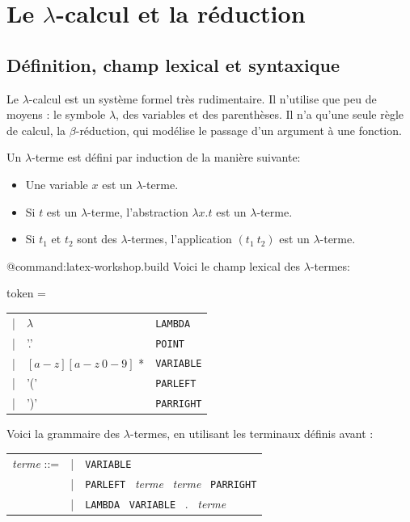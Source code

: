 \chapter{Le $\lambda$-calcul et la réduction}

\section{Définition, champ lexical et syntaxique}

Le $\lambda$-calcul est un système formel très rudimentaire. Il n'utilise que  
peu de moyens : le symbole $\lambda$, des variables et des parenthèses. Il n'a
qu'une seule règle de calcul, la $\beta$-réduction, qui modélise le passage d'un
argument à une fonction.

\begin{definition}
Un $\lambda $-terme est défini par induction de la manière suivante:
\begin{itemize}
  \item Une  variable $x$ est un $\lambda$-terme.
  \item Si $t$ est un $\lambda$-terme, l'abstraction $\lambda x.t$ est un $\lambda$-terme.
  \item Si $t_1$ et $t_2$ sont des $\lambda$-termes, l'application $(t_1 \ t_2)$ est un $\lambda$-terme.
\end{itemize}
\end{definition}
@command:latex-workshop.build
Voici le champ lexical des $\lambda $-termes:

\vspace{0.2cm}
token = \begin{tabular}{lll}
| & $\lambda$  & 	{ \texttt{LAMBDA} } \\
| & '.' &  { \texttt{POINT} } \\
| & $[ a-z ] [ a-z\  0-9 ]$ * & { \texttt{VARIABLE} } \\
| & '('	 &	{ \texttt{PARLEFT} } \\
| & ')'	 &	{ \texttt{PARRIGHT} }
\end{tabular}
\vspace{0.4cm}

Voici la grammaire des $\lambda $-termes, en utilisant les terminaux définis
avant :

\vspace{0.2cm}
\begin{tabular}{lll}
\textit{terme} ::= & | & \texttt{VARIABLE}  \\
& | & \texttt{PARLEFT} \ \textit{terme} \ \textit{terme} \ \texttt{PARRIGHT} \\
& |& \texttt{LAMBDA} \ \texttt{VARIABLE} \  . \ \textit{terme}
\end{tabular}
\vspace{0.2cm}

